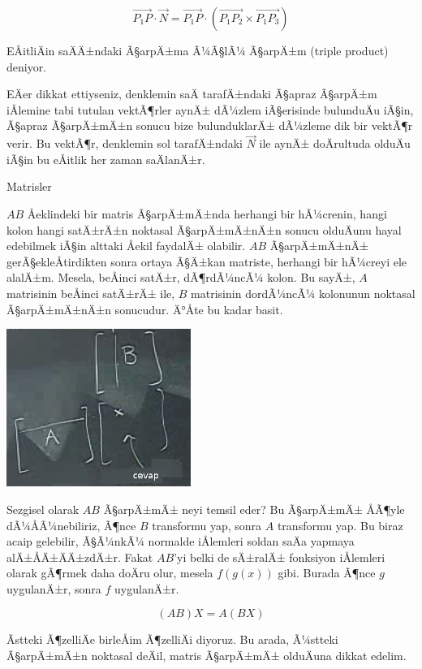 \documentclass[12pt,fleqn]{article}\usepackage{../../common}
\begin{document}
$$ \vec{P_1P} \cdot \vec{N} = 
\vec{P_1P} \cdot (\vec{P_1P_2} \times \vec{P_1P_3})
$$

EÅitliÄin saÄÄ±ndaki Ã§arpÄ±ma Ã¼Ã§lÃ¼ Ã§arpÄ±m (triple product) deniyor. 

EÄer dikkat ettiyseniz, denklemin saÄ tarafÄ±ndaki Ã§apraz Ã§arpÄ±m iÅlemine tabi 
tutulan vektÃ¶rler aynÄ± dÃ¼zlem iÃ§erisinde bulunduÄu iÃ§in, Ã§apraz Ã§arpÄ±mÄ±n sonucu 
bize bulunduklarÄ± dÃ¼zleme dik bir vektÃ¶r verir. Bu vektÃ¶r, denklemin sol 
tarafÄ±ndaki $\vec{N}$ ile aynÄ± doÄrultuda olduÄu iÃ§in bu eÅitlik her zaman 
saÄlanÄ±r.


Matrisler

$AB$ Åeklindeki bir matris Ã§arpÄ±mÄ±nda herhangi bir hÃ¼crenin, hangi kolon hangi
satÄ±rÄ±n noktasal Ã§arpÄ±mÄ±nÄ±n sonucu olduÄunu hayal edebilmek iÃ§in
alttaki Åekil faydalÄ± olabilir. $AB$ Ã§arpÄ±mÄ±nÄ± gerÃ§ekleÅtirdikten sonra ortaya 
Ã§Ä±kan matriste, herhangi bir hÃ¼creyi ele alalÄ±m. Mesela, beÅinci satÄ±r, dÃ¶rdÃ¼ncÃ¼ 
kolon. Bu sayÄ±, $A$ matrisinin beÅinci satÄ±rÄ± ile, $B$ matrisinin dordÃ¼ncÃ¼ 
kolonunun noktasal Ã§arpÄ±mÄ±nÄ±n sonucudur. Ä°Åte bu kadar basit.

\begin{center}
\includegraphics[width=6cm]{3_4.png}
\end{center}


Sezgisel olarak $AB$ Ã§arpÄ±mÄ± neyi temsil eder? Bu Ã§arpÄ±mÄ± ÅÃ¶yle
dÃ¼ÅÃ¼nebiliriz, Ã¶nce $B$ transformu yap, sonra $A$ transformu yap. Bu biraz
acaip gelebilir, Ã§Ã¼nkÃ¼ normalde iÅlemleri soldan saÄa yapmaya
alÄ±ÅÄ±ÄÄ±zdÄ±r. Fakat $AB$'yi belki de sÄ±ralÄ± fonksiyon iÅlemleri olarak
gÃ¶rmek daha doÄru olur, mesela $f(g(x))$ gibi. Burada Ã¶nce $g$ uygulanÄ±r,
sonra $f$ uygulanÄ±r. 

$$ (AB)X = A(BX) $$

Ãstteki Ã¶zelliÄe birleÅim Ã¶zelliÄi diyoruz. Bu arada, Ã¼stteki Ã§arpÄ±mÄ±n noktasal 
deÄil, matris Ã§arpÄ±mÄ±
olduÄuna dikkat edelim. 
\end{document}
